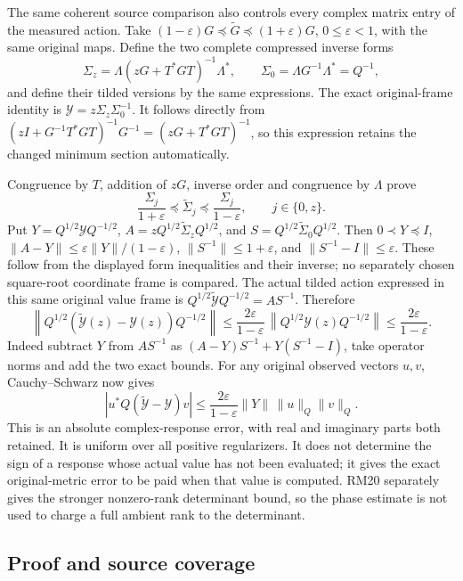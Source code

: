 \documentclass[11pt]{article}
\begin{document}
The same coherent source comparison also controls every complex matrix entry of the measured action. Take \((1-\varepsilon)G\preceq\widetilde G\preceq(1+\varepsilon)G\), \(0\le\varepsilon<1\), with the same original maps. Define the two complete compressed inverse forms \[
 \Sigma_z=\Lambda(zG+T^*GT)^{-1}\Lambda^*,\qquad
 \Sigma_0=\Lambda G^{-1}\Lambda^*=Q^{-1},
\] and define their tilded versions by the same expressions. The exact original-frame identity is \(\mathscr Y=z\Sigma_z\Sigma_0^{-1}\). It follows directly from \((zI+G^{-1}T^*GT)^{-1}G^{-1}=(zG+T^*GT)^{-1}\), so this expression retains the changed minimum section automatically.

Congruence by \(T\), addition of \(zG\), inverse order and congruence by \(\Lambda\) prove \[
 \frac{\Sigma_j}{1+\varepsilon}\preceq\widetilde\Sigma_j
 \preceq\frac{\Sigma_j}{1-\varepsilon},\qquad j\in\{0,z\}.
\] Put \(Y=Q^{1/2}\mathscr YQ^{-1/2}\), \(A=zQ^{1/2}\widetilde\Sigma_zQ^{1/2}\), and \(S=Q^{1/2}\widetilde\Sigma_0Q^{1/2}\). Then \(0\prec Y\preceq I\), \(\|A-Y\|\le\varepsilon\|Y\|/(1-\varepsilon)\), \(\|S^{-1}\|\le1+\varepsilon\), and \(\|S^{-1}-I\|\le\varepsilon\). These follow from the displayed form inequalities and their inverse; no separately chosen square-root coordinate frame is compared. The actual tilded action expressed in this same original value frame is \(Q^{1/2}\widetilde{\mathscr Y}Q^{-1/2}=AS^{-1}\). Therefore \[
 \boxed{\left\|Q^{1/2}(\widetilde{\mathscr Y}(z)-\mathscr Y(z))Q^{-1/2}\right\|
 \le\frac{2\varepsilon}{1-\varepsilon}\,
       \left\|Q^{1/2}\mathscr Y(z)Q^{-1/2}\right\|
 \le\frac{2\varepsilon}{1-\varepsilon}.}
 \tag{RM23}
\] Indeed subtract \(Y\) from \(AS^{-1}\) as \((A-Y)S^{-1}+Y(S^{-1}-I)\), take operator norms and add the two exact bounds. For any original observed vectors \(u,v\), Cauchy--Schwarz now gives \[
 |u^*Q(\widetilde{\mathscr Y}-\mathscr Y)v|
 \le\frac{2\varepsilon}{1-\varepsilon}\|Y\|\,\|u\|_Q\|v\|_Q.
\] This is an absolute complex-response error, with real and imaginary parts both retained. It is uniform over all positive regularizers. It does not determine the sign of a response whose actual value has not been evaluated; it gives the exact original-metric error to be paid when that value is computed. RM20 separately gives the stronger nonzero-rank determinant bound, so the phase estimate is not used to charge a full ambient rank to the determinant.

\subsection{Proof and source coverage}\label{proof-and-source-coverage}
\end{document}
